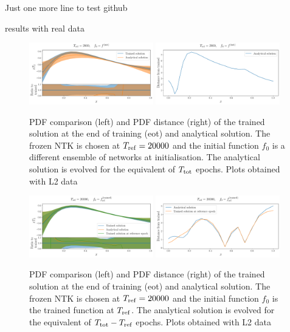 Just one more line to test github

 results with real data
 \begin{figure}[h]
    \centering
    \includegraphics[width=0.48\textwidth]{plots/pdf_plot_init.pdf}
    \includegraphics[width=0.48\textwidth]{plots/distance_plot_init.pdf}
    \caption{PDF comparison (left) and PDF distance (right) of the trained
    solution at the end of training (eot) and analytical solution. The frozen NTK
    is chosen at $T_{\rm ref} = 20000$ and the initial function $f_0$ is a
    different ensemble of networks at initialisation. The analytical solution is
    evolved for the equivalent of $T_{\rm tot}$ epochs. \ac{Plots obtained with L2
    data}}
    \label{fig:xT3_analytical_init}
  \end{figure}
  
  \begin{figure}[h]
    \centering
    \includegraphics[width=0.48\textwidth]{plots/pdf_plot_ref_20000.pdf}
    \includegraphics[width=0.48\textwidth]{plots/distance_plot_ref_20000.pdf}
    \caption{PDF comparison (left) and PDF distance (right) of the trained
    solution at the end of training (eot) and analytical solution. The frozen NTK
    is chosen at $T_{\rm ref} = 20000$ and the initial function $f_0$ is the
    trained function at $T_{\rm ref}$. The analytical solution is evolved for the
    equivalent of $T_{\rm tot} - T_{\rm ref}$ epochs. \ac{Plots obtained with L2
    data}}
    \label{fig:xT3_analytical_ref}
  \end{figure}
  
